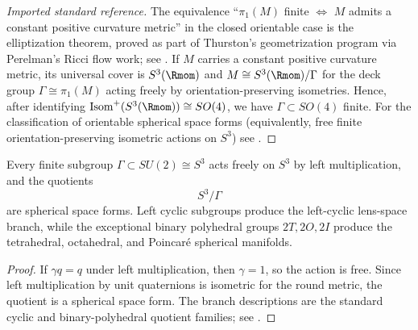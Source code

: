 \documentclass[11pt]{article}
\begin{document}
\begin{proof}[Imported standard reference]
The equivalence ``$\pi_1(M)$ finite $\Leftrightarrow$ $M$ admits a constant positive curvature metric'' in the closed orientable case is the elliptization theorem, proved as part of Thurston's geometrization program via Perelman's Ricci flow work; see \cite{Thurston1997,Perelman2002entropy,Perelman2003surgery,Perelman2003extinction}. If $M$ carries a constant positive curvature metric, its universal cover is $S^3(\Rmom)$ and $M \cong S^3(\Rmom)/\Gamma$ for the deck group $\Gamma \cong \pi_1(M)$ acting freely by orientation-preserving isometries. Hence, after identifying $\mathrm{Isom}^+(S^3(\Rmom))\cong SO(4)$, we have $\Gamma\subset SO(4)$ finite. For the classification of orientable spherical space forms (equivalently, free finite orientation-preserving isometric actions on $S^3$) see \cite{wolf2011spaces}.
\end{proof}

\begin{corollary}
\label{p1:cor:left-quotient-spherical-space-forms}
Every finite subgroup \(\Gamma\subset SU(2)\cong S^3\) acts freely on \(S^3\) by left multiplication, and the quotients
\[
S^3/\Gamma
\]
are spherical space forms. Left cyclic subgroups produce the left-cyclic lens-space branch, while the exceptional binary polyhedral groups \(2T,2O,2I\) produce the tetrahedral, octahedral, and Poincar\'e spherical manifolds.
\cite{wolf2011spaces}
\end{corollary}

\begin{proof}
If \(\gamma q=q\) under left multiplication, then \(\gamma=1\), so the action is free. Since left multiplication by unit quaternions is isometric for the round metric, the quotient is a spherical space form. The branch descriptions are the standard cyclic and binary-polyhedral quotient families; see \cite{wolf2011spaces}.
\end{proof}
\end{document}
